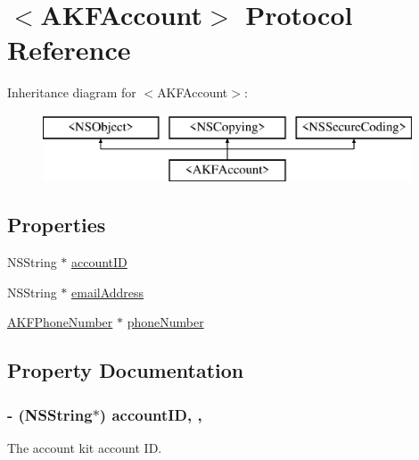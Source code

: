\hypertarget{protocol_a_k_f_account-p}{}\section{$<$A\+K\+F\+Account$>$ Protocol Reference}
\label{protocol_a_k_f_account-p}
Inheritance diagram for $<$A\+K\+F\+Account$>$\+:\begin{figure}[H]
\begin{center}
\leavevmode
\includegraphics[height=2.000000cm]{protocol_a_k_f_account-p}
\end{center}
\end{figure}
\subsection*{Properties}
\begin{DoxyCompactItemize}
\item 
N\+S\+String $\ast$ \hyperlink{protocol_a_k_f_account-p_a89a78fb85dfe94b51c15c3739692ef0b}{account\+I\+D}
\item 
N\+S\+String $\ast$ \hyperlink{protocol_a_k_f_account-p_a53f940fb4d2e951bef36867a8f455086}{email\+Address}
\item 
\hyperlink{interface_a_k_f_phone_number}{A\+K\+F\+Phone\+Number} $\ast$ \hyperlink{protocol_a_k_f_account-p_abbb9ced6a92928565096ae01428d8751}{phone\+Number}
\end{DoxyCompactItemize}


\subsection{Property Documentation}
\hypertarget{protocol_a_k_f_account-p_a89a78fb85dfe94b51c15c3739692ef0b}{}
\subsubsection[{account\+I\+D}]{\setlength{\rightskip}{0pt plus 5cm}-\/ (N\+S\+String$\ast$) account\+I\+D\hspace{0.3cm}{\ttfamily [read]}, {\ttfamily [nonatomic]}, {\ttfamily [copy]}}\label{protocol_a_k_f_account-p_a89a78fb85dfe94b51c15c3739692ef0b}
The account kit account I\+D. \hypertarget{protocol_a_k_f_account-p_a53f940fb4d2e951bef36867a8f455086}{}

